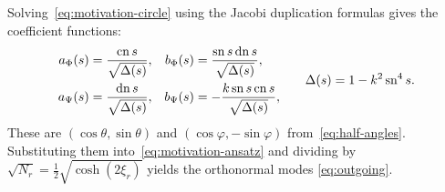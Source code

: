 Solving~\eqref{eq:motivation-circle} using the Jacobi duplication formulas
gives the coefficient functions:
\begin{equation}
  \begin{aligned}
    a_\Phi(s)&=\frac{\operatorname{cn} s}{\sqrt{\Delta(s)}},&
    b_\Phi(s)&=\frac{\operatorname{sn} s\operatorname{dn} s}{\sqrt{\Delta(s)}},\\
    a_\Psi(s)&=\frac{\operatorname{dn} s}{\sqrt{\Delta(s)}},&
    b_\Psi(s)&=-\frac{k\operatorname{sn} s\operatorname{cn} s}{\sqrt{\Delta(s)}},
  \end{aligned}
  \qquad \Delta(s)=1-k^2\operatorname{sn}^4s.
  \label{eq:motivation-coefficients}
\end{equation}
These are $(\cos\theta,\sin\theta)$ and
$(\cos\varphi,-\sin\varphi)$ from~\eqref{eq:half-angles}. Substituting
them into~\eqref{eq:motivation-ansatz} and dividing by
$\sqrt{N_r}=\frac12\sqrt{\cosh(2\xi_r)}$ yields the orthonormal modes
\eqref{eq:outgoing}.
